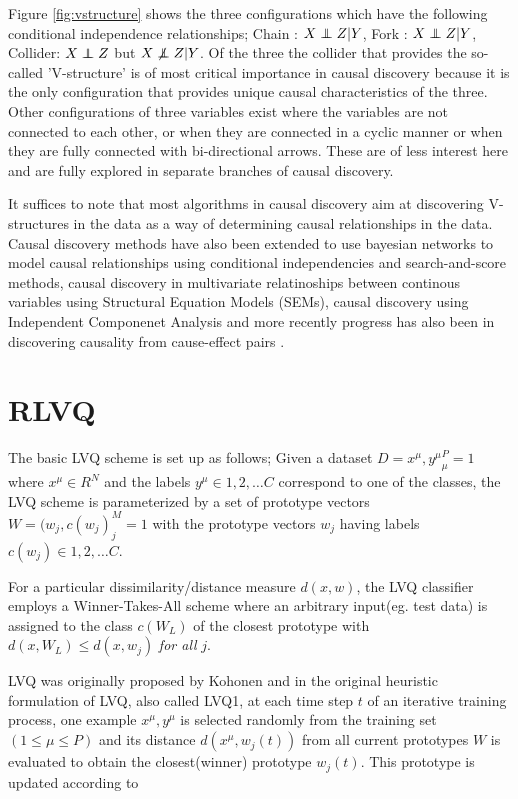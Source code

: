 \documentclass{esannV2}
\newcommand\independent{\protect\mathpalette{\protect\independenT}{\perp}}
\def\independenT#1#2{\mathrel{\rlap{$#1#2$}\mkern2mu{#1#2}}}
\def\ci{\independent}
\def\dep{\not\independent}
\begin{document}
Figure \ref{fig:vstructure} shows the three configurations which have the following conditional independence relationships; Chain : $X \ci Z | Y$, Fork : $X \ci Z | Y$, Collider: $X \ci Z$ but $X \dep Z | Y$. Of the three the collider that provides the so-called 'V-structure' is of most critical importance in causal discovery because it is the only configuration that provides unique causal characteristics of the three. Other configurations of three variables exist where the variables are not connected to each other, or when they are connected in a cyclic manner or when they are fully connected with bi-directional arrows. These are of less interest here and are fully explored in separate branches of causal discovery.

It suffices to note that most algorithms in causal discovery aim at discovering V-structures in the data as a way of determining causal relationships in the data. Causal discovery methods have also been extended to use bayesian networks to model causal relationships using conditional independencies and search-and-score methods, causal discovery in multivariate relatinoships between continous variables using Structural Equation Models (SEMs), causal discovery using Independent Componenet Analysis \cite{15} and more recently progress has also been in discovering causality from cause-effect pairs \cite{14}.

\section{RLVQ}
\label{sec:RLVQ}

The basic LVQ scheme is set up as follows; Given a dataset $D = {x^\mu, y^\mu}^P_\mu = 1$ where $x^\mu \in R^N$ and the labels $y^\mu \in {1,2,\ldots C}$ correspond to one of the classes, the LVQ scheme is parameterized by a set of prototype vectors $W = {(w_j, c(w_j)}^M_j=1$ with the prototype vectors $w_j$ having labels $c(w_j) \in {1,2,\dots C}$.

For a particular dissimilarity/distance measure $d(x,w)$, the LVQ classifier employs a Winner-Takes-All scheme where an arbitrary input(eg. test data) is assigned to the class $c(W_L)$ of the closest prototype with $d(x,W_L) \leq d(x,w_j)$ \textsl{for all} $j$.

LVQ was originally proposed by Kohonen and in the original heuristic formulation of LVQ, also called LVQ1\cite{02}, at each time step $t$ of an iterative training process, one example ${x^\mu, y^\mu}$ is selected randomly from the training set $(1 \leq \mu \leq P)$ and its distance $d(x^\mu,w_j(t))$  from all current prototypes $W$ is evaluated to obtain the closest(winner) prototype $w_j(t)$. This prototype is updated according to
\end{document}

